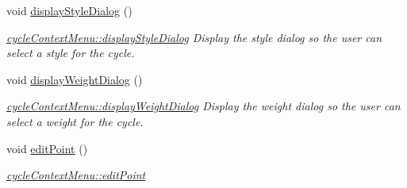 \begin{DoxyCompactItemize}
\mbox{\label{classcycle_context_menu_a094bbed14bab12e3b9ac3ae07140bdcb}} 
void \mbox{\hyperlink{classcycle_context_menu_a094bbed14bab12e3b9ac3ae07140bdcb}{display\+Style\+Dialog}} ()
\begin{DoxyCompactList}\small\item\em \mbox{\hyperlink{classcycle_context_menu_a094bbed14bab12e3b9ac3ae07140bdcb}{cycle\+Context\+Menu\+::display\+Style\+Dialog}} Display the style dialog so the user can select a style for the cycle. \end{DoxyCompactList}\item 
\mbox{\label{classcycle_context_menu_ac720f89ffd13952e79dd77c1bb15c2aa}} 
void \mbox{\hyperlink{classcycle_context_menu_ac720f89ffd13952e79dd77c1bb15c2aa}{display\+Weight\+Dialog}} ()
\begin{DoxyCompactList}\small\item\em \mbox{\hyperlink{classcycle_context_menu_ac720f89ffd13952e79dd77c1bb15c2aa}{cycle\+Context\+Menu\+::display\+Weight\+Dialog}} Display the weight dialog so the user can select a weight for the cycle. \end{DoxyCompactList}\item 
void \mbox{\hyperlink{classcycle_context_menu_ae807f1cddefcdedf9f8c60473bd287df}{edit\+Point}} ()
\begin{DoxyCompactList}\small\item\em \mbox{\hyperlink{classcycle_context_menu_ae807f1cddefcdedf9f8c60473bd287df}{cycle\+Context\+Menu\+::edit\+Point}} \end{DoxyCompactList}\end{DoxyCompactItemize}
